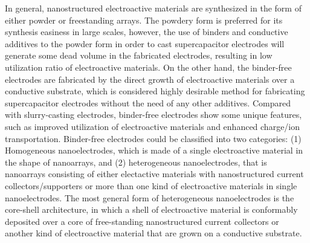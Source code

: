 \documentclass[reprint,amsmath,amssymb,aps,floatfix,
]{revtex4-2}
\begin{document}
In general, nanostructured electroactive materials are synthesized in the form of either powder or freestanding arrays. The powdery form is preferred for its synthesis easiness in large scales, however, the use of binders and conductive additives to the powder form in order to cast supercapacitor electrodes will generate some dead volume in the fabricated electrodes, resulting in low utilization ratio of electroactive materials.\cite{Guihua2011} On the other hand, the binder-free electrodes are fabricated by the direct growth of electroactive materials over a conductive substrate, which is considered highly desirable method for fabricating supercapacitor electrodes without the need of any other additives. Compared with slurry-casting electrodes, binder-free electrodes show some unique features, such as improved utilization of electroactive materials and enhanced charge/ion transportation. Binder-free electrodes could be classified into two categories: (1) Homogeneous nanoelectrodes, which is made of a single electroactive material in the shape of nanoarrays, and (2) heterogeneous nanoelectrodes, that is nanoarrays consisting of either electactive materials with nanostructured current collectors/supporters or more than one kind of electroactive materials in single nanoelectrodes. The most general form of heterogeneous nanoelectrodes is the core-shell architecture, in which a shell of electroactive material is conformably deposited over a core of free-standing nanostructured current collectors or another kind of electroactive material that are grown on a conductive substrate.\cite{Reddy2012}
\end{document}
